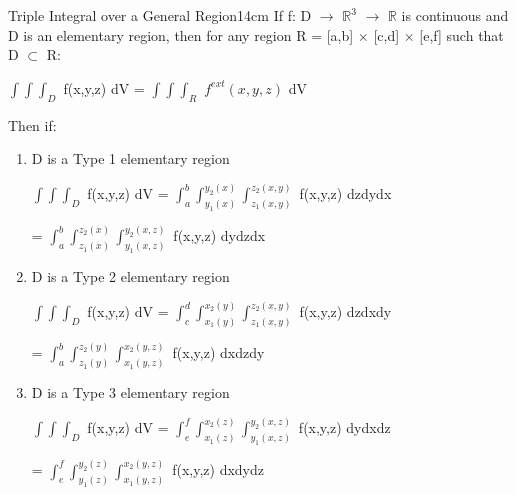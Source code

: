    \newpage



    \begin{wtheorem}{Triple Integral over a General Region}{14cm}
        If f: D $\rightarrow$ $\mathbb{R}^3$ $\rightarrow$ $\mathbb{R}$
        is continuous and D is an elementary region, then
        for any region R = [a,b] $\times$ [c,d] $\times$ [e,f]
        such that D $\subset$ R:

        \hspace{0.5cm}
        $\int \int \int_D$ f(x,y,z) dV
        = $\int \int \int_R$ $f^{ext}(x,y,z)$ dV

        Then if:

        \begin{enumerate}[label=(\alph*), leftmargin=1cm, itemsep=0.1cm]
            \item D is a Type 1 elementary region
            
                \hspace{0.5cm}
                $\int \int \int_D$ f(x,y,z) dV
                = $\int_a^b \int_{y_1(x)}^{y_2(x)}
                    \int_{z_1(x,y)}^{z_2(x,y)}$ f(x,y,z) dzdydx

                \hspace{3.9cm}
                = $\int_a^b \int_{z_1(x)}^{z_2(x)}
                    \int_{y_1(x,z)}^{y_2(x,z)}$ f(x,y,z) dydzdx

            \item D is a Type 2 elementary region
            
                \hspace{0.5cm}
                $\int \int \int_D$ f(x,y,z) dV
                = $\int_c^d \int_{x_1(y)}^{x_2(y)}
                    \int_{z_1(x,y)}^{z_2(x,y)}$ f(x,y,z) dzdxdy

                \hspace{3.9cm}
                = $\int_a^b \int_{z_1(y)}^{z_2(y)}
                    \int_{x_1(y,z)}^{x_2(y,z)}$ f(x,y,z) dxdzdy

            \item D is a Type 3 elementary region
            
                \hspace{0.5cm}
                $\int \int \int_D$ f(x,y,z) dV
                = $\int_e^f \int_{x_1(z)}^{x_2(z)}
                    \int_{y_1(x,z)}^{y_2(x,z)}$ f(x,y,z) dydxdz

                \hspace{3.9cm}
                = $\int_e^f \int_{y_1(z)}^{y_2(z)}
                    \int_{x_1(y,z)}^{x_2(y,z)}$ f(x,y,z) dxdydz
        \end{enumerate}
    \end{wtheorem}

